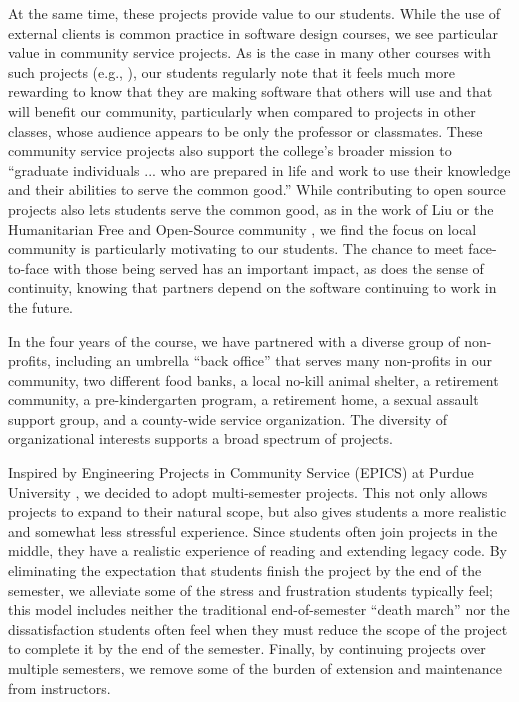At the same time, these projects provide value to our students.  While
the use of external clients is common practice in software design courses,
we see particular value in community service projects.  As
is the case in many other courses with such
projects (e.g., \cite{buckley-2004,coyle-2005,liu-2005,lange-2011,leidig-2006,hfoss-2018}), 
our students
regularly note that it feels much more rewarding to know that they are
making software that others will use and that will benefit our community,
particularly when compared to projects in other classes, whose audience
appears to be only the professor or classmates.
These community service projects also support
the college's broader mission to ``graduate individuals ... who are
prepared in life and work to use their knowledge and their abilities
to serve the common good.'' \cite{grinnell-mission}
While contributing to open source projects also lets students serve 
the common good, as in the work of Liu \cite{liu-2005} or the
Humanitarian Free and Open-Source community \cite{hfoss-2018},
we find the focus on local community is particularly motivating to our 
students.
The chance to meet face-to-face with those being served has an important
impact, as does the sense of continuity, knowing that partners depend on 
the software continuing to work in the future.

In the four years of the course, we have partnered with a diverse
group of non-profits, including an umbrella ``back office'' that
serves many non-profits in our community, two different food banks,
a local no-kill animal shelter, a retirement community, a
pre-kindergarten program, a retirement home, a sexual assault support
group, and a county-wide service organization.  The diversity of
organizational interests supports a broad spectrum of projects.

Inspired by Engineering Projects in Community Service (EPICS) at
Purdue University \cite{coyle-2005}, we decided to adopt multi-semester
projects. This not only allows projects to expand to their natural
scope, but also gives students a more realistic and somewhat less 
stressful experience.  Since
students often join projects in the middle, they have a realistic
experience of reading and extending legacy code.  By eliminating the
expectation that students finish the project by the end of the
semester, we alleviate some of the stress and frustration students typically
feel; this model includes neither the traditional end-of-semester
``death march'' nor the dissatisfaction students often feel when 
they must reduce the scope of the project to complete it by the
end of the semester.  Finally, by continuing projects over multiple
semesters, we remove some of the burden of extension and maintenance
from instructors.

